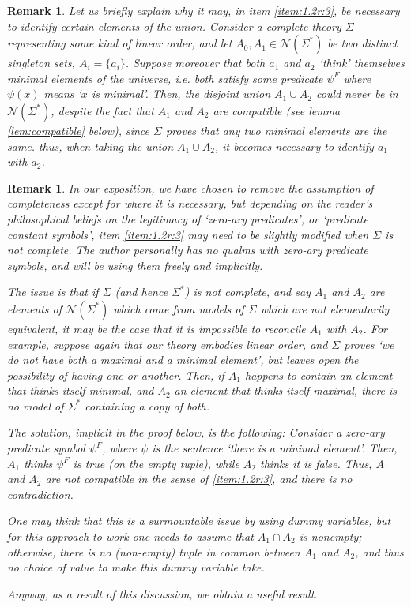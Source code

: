 \documentclass{article}
\newtheorem{remark}[theorem]{Remark}
\theoremstyle{nonumberplain}
\newcommand{\calN}{\mathcal{N}}
\begin{document}
\begin{remark}
Let us briefly explain why it may, in item \ref{item:1.2r:3}, be necessary to identify certain elements of the union. Consider a complete theory $\Sigma$ representing some kind of linear order, and let $A_0, A_1 \in \calN(\Sigma^*)$ be two distinct singleton sets, $A_i = \{a_i\}$. Suppose moreover that both $a_1$ and $a_2$ `think' themselves minimal elements of the universe, i.e. both satisfy some predicate $\psi^F$ where $\psi(x)$ means `$x$ is minimal'. Then, the disjoint union $A_1 \cup A_2$ could never be in $\calN(\Sigma^*)$, despite the fact that $A_1$ and $A_2$ are compatible (see lemma \ref{lem:compatible} below), since $\Sigma$ proves that any two minimal elements are the same. thus, when taking the union $A_1 \cup A_2$, it becomes necessary to identify $a_1$ with $a_2$.
\end{remark}

\begin{remark}\label{rmk:compatible}
In our exposition, we have chosen to remove the assumption of completeness except for where it is necessary, but depending on the reader's philosophical beliefs on the legitimacy of `zero-ary predicates', or `predicate constant symbols', item \ref{item:1.2r:3} may need to be slightly modified when $\Sigma$ is not complete. The author personally has no qualms with zero-ary predicate symbols, and will be using them freely and implicitly.

The issue is that if $\Sigma$ (and hence $\Sigma^*$) is not complete, and say $A_1$ and $A_2$ are elements of $\calN(\Sigma^*)$ which come from models of $\Sigma$ which are \emph{not} elementarily equivalent, it may be the case that it is impossible to reconcile $A_1$ with $A_2$. For example, suppose again that our theory embodies linear order, and $\Sigma$ proves `we do not have both a maximal and a minimal element', but leaves open the possibility of having one or another. Then, if $A_1$ happens to contain an element that thinks itself minimal, and $A_2$ an element that thinks itself maximal, there is no model of $\Sigma^*$ containing a copy of both.

The solution, implicit in the proof below, is the following: Consider a zero-ary predicate symbol $\psi^F$, where $\psi$ is the sentence `there is a minimal element'. Then, $A_1$ thinks $\psi^F$ is true (on the empty tuple), while $A_2$ thinks it is false. Thus, $A_1$ and $A_2$ are not compatible in the sense of \ref{item:1.2r:3}, and there is no contradiction.

One may think that this is a surmountable issue by using dummy variables, but for this approach to work one needs to assume that $A_1 \cap A_2$ is nonempty; otherwise, there is no (non-empty) tuple in common between $A_1$ and $A_2$, and thus no choice of value to make this dummy variable take.

Anyway, as a result of this discussion, we obtain a useful result.
\end{remark}
\end{document}
